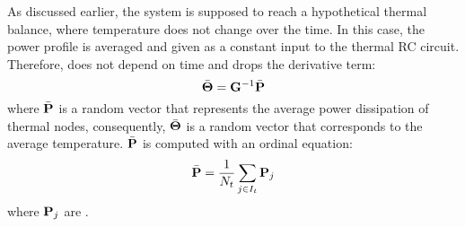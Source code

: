 As discussed earlier, the system is supposed to reach a hypothetical thermal balance, where temperature does not change over the time. In this case, the power profile is averaged and given as a constant input to the thermal RC circuit. Therefore,  does not depend on time and drops the derivative term:
\begin{equation} \equlabel{steady-fourier}
  \a{\vtemperature} = \mconductance^{-1} \a{\vpower}
\end{equation}
where $\bar{\mathbf{P}}$ is a random vector that represents the average power dissipation of thermal nodes, consequently, $\bar{\mathbf{\Theta}}$ is a random vector that corresponds to the average temperature. $\bar{\mathbf{P}}$ is computed with an ordinal equation:
\[
  \bar{\mathbf{P}} = \frac{1}{N_t} \sum_{j \in I_t} \mathbf{P}_j
\]
where $\mathbf{P}_j$ are \mnrvs.


